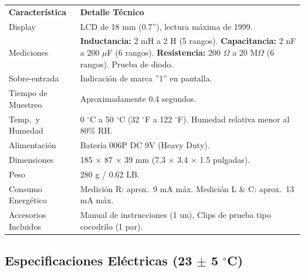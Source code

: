 \documentclass[11pt]{article}
\begin{document}
\begin{center}
{\renewcommand{\arraystretch}{1.7}\small
\begin{tabular}{l p{9.5cm}}
    \rowcolor{LightGray}
    \textbf{Característica} & \textbf{Detalle Técnico} \\
    Display & LCD de 18 mm (0.7''), lectura máxima de 1999. \\
    Mediciones &
        \textbf{Inductancia:} 2 mH a 2 H (5 rangos). \newline
        \textbf{Capacitancia:} 2 nF a 200 $\mu$F (6 rangos). \newline
        \textbf{Resistencia:} 200 $\Omega$ a 20 M$\Omega$ (6 rangos). \newline
        Prueba de diodo. \\
    Sobre-entrada & Indicación de marca ''1'' en pantalla. \\
    Tiempo de Muestreo & Aproximadamente 0.4 segundos. \\
    Temp.\ y Humedad &
        0 $^\circ$C a 50 $^\circ$C (32 $^\circ$F a 122 $^\circ$F). \newline
        Humedad relativa menor al 80\% RH. \\
    Alimentación & Batería 006P DC 9V (Heavy Duty). \\
    Dimensiones & 185 $\times$ 87 $\times$ 39 mm (7.3 $\times$ 3.4 $\times$ 1.5 pulgadas). \\
    Peso & 280 g / 0.62 LB. \\
    Consumo Energético &
        Medición R: aprox.\ 9 mA máx. \newline
        Medición L \& C: aprox.\ 13 mA máx. \\
    Accesorios Incluidos &
        Manual de instrucciones (1 un),
        Clips de prueba tipo cocodrilo (1 par). \\
    \hline
\end{tabular}}
\end{center}

\subsection{Especificaciones Eléctricas (23 $\pm$ 5 $^{\circ}$C)}
\end{document}
